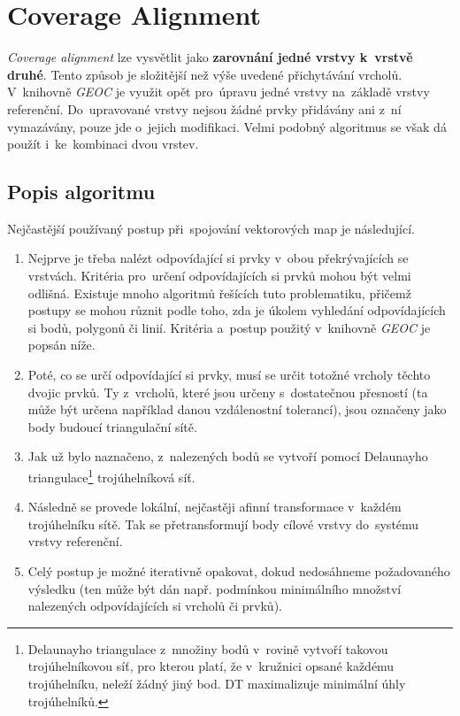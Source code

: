 \section{Coverage Alignment} 
\label{coverage alignment}

\textit{Coverage alignment} lze vysvětlit jako \textbf{zarovnání jedné vrstvy 
k~vrstvě druhé}. Tento způsob je složitější než výše uvedené přichytávání vrcholů.
V~knihovně \textit{GEOC} je využit opět pro~úpravu jedné vrstvy na~základě vrstvy 
referenční. Do~upravované vrstvy nejsou žádné prvky přidávány ani z~ní vymazávány,
pouze jde o~jejich modifikaci. Velmi podobný algoritmus se však dá použít 
i~ke~kombinaci dvou vrstev. 

\subsection{Popis algoritmu}
\label{ca-algoritmus}

Nejčastější používaný postup při~spojování vektorových map je následující.

\begin{enumerate}
 \item Nejprve je třeba nalézt odpovídající si prvky v~obou překrývajících se 
    vrstvách. Kritéria pro~určení odpovídajících si prvků mohou být velmi 
    odlišná. Existuje mnoho algoritmů řešících tuto problematiku, přičemž 
    postupy se mohou různit podle toho, zda je úkolem vyhledání 
    odpovídajících si bodů, polygonů či linií. Kritéria a~postup použitý 
    v~knihovně \textit{GEOC} je popsán níže.
 \item Poté, co se určí odpovídající si prvky, musí se určit totožné vrcholy 
    těchto dvojic prvků. Ty z~vrcholů, které jsou určeny s~dostatečnou 
    přesností (ta může být určena například danou vzdálenostní tolerancí), 
    jsou označeny jako body budoucí triangulační sítě.
 \item Jak už bylo naznačeno, z~nalezených bodů se vytvoří pomocí Delaunayho 
    triangulace\footnote{Delaunayho triangulace z~množiny bodů v~rovině vytvoří takovou 
    trojúhelníkovou síť, pro kterou platí, že v~kružnici opsané každému
    trojúhelníku, neleží žádný jiný bod. DT maximalizuje
    minimální úhly trojúhelníků.} trojúhelníková síť. 
 \item Následně se provede lokální, nejčastěji afinní transformace v~každém 
    trojúhelníku sítě. Tak se přetransformují body cílové vrstvy do~systému 
    vrstvy referenční.
 \item Celý postup je možné iterativně opakovat, dokud nedosáhneme 
    požadovaného výsledku (ten může být dán např. podmínkou minimálního 
    množství nalezených odpovídajících si vrcholů či prvků).
\end{enumerate}

